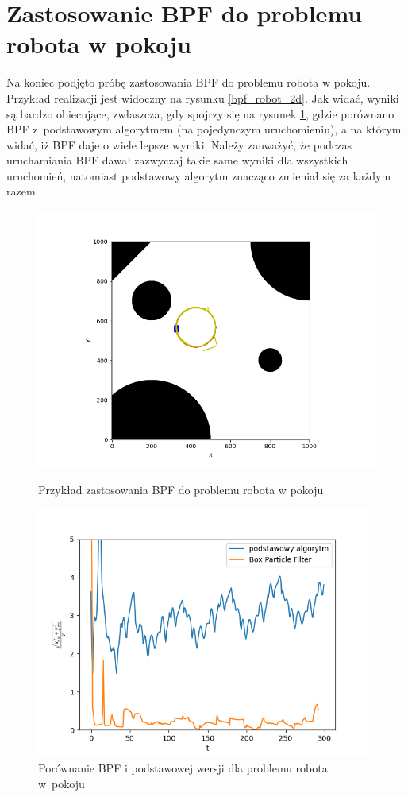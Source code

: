 \section{Zastosowanie BPF do problemu robota w pokoju}
Na koniec podjęto próbę zastosowania BPF do problemu robota w pokoju. Przykład realizacji jest widoczny na rysunku \ref{bpf_robot_2d}. Jak widać, wyniki są bardzo obiecujące, zwłaszcza, gdy spojrzy się na rysunek \ref{bpf_robot_2d_err}, gdzie porównano BPF z~podstawowym algorytmem (na pojedynczym uruchomieniu), a na którym widać, iż BPF daje o wiele lepsze wyniki. Należy zauważyć, że podczas uruchamiania BPF dawał zazwyczaj takie same wyniki dla wszystkich uruchomień, natomiast podstawowy algorytm znacząco zmieniał się za każdym razem.
\begin{figure}[H]
	\begin{center}
		\includegraphics[width=12cm]{./bpf_robot_2d.png}
		\caption{Przykład zastosowania BPF do problemu robota w pokoju}
		\label{bpf_robot_2d}
	\end{center}

	\begin{center}
		\includegraphics[width=11cm]{./bpf_robot_2d_err.png}
		\caption{Porównanie BPF i podstawowej wersji dla problemu robota w~pokoju}
		\label{bpf_robot_2d_err}
	\end{center}
\end{figure}


